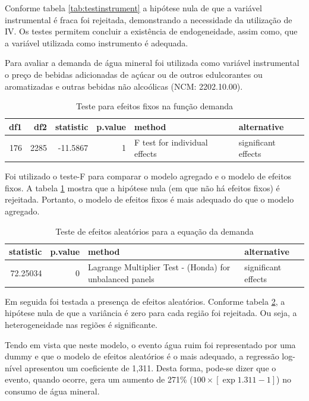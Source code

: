 \documentclass[
  12pt,
]{book}
\begin{document}
Conforme tabela \ref{tab:testinstrument} a hipótese nula de que a variável instrumental é fraca foi rejeitada, demonstrando a necessidade da utilização de IV. Os testes permitem concluir a existência de endogeneidade, assim como, que a variável utilizada como instrumento é adequada.

Para avaliar a demanda de água mineral foi utilizada como variável instrumental o preço de bebidas adicionadas de açúcar ou de outros edulcorantes ou aromatizadas e outras bebidas não alcoólicas (NCM: 2202.10.00).

\begin{table}

\caption{\label{tab:testf}Teste para efeitos fixos na função demanda}
\centering
\begin{tabular}[t]{r|r|r|r|l|l}
\hline
df1 & df2 & statistic & p.value & method & alternative\\
\hline
176 & 2285 & -11.5867 & 1 & F test for individual effects & significant effects\\
\hline
\end{tabular}
\end{table}

Foi utilizado o teste-F para comparar o modelo agregado e o modelo de efeitos fixos. A tabela \ref{tab:testf} mostra que a hipótese nula (em que não há efeitos fixos) é rejeitada. Portanto, o modelo de efeitos fixos é mais adequado do que o modelo agregado.

\begin{table}

\caption{\label{tab:randomt2}Teste de efeitos aleatórios para a equação da demanda}
\centering
\begin{tabular}[t]{r|r|l|l}
\hline
statistic & p.value & method & alternative\\
\hline
72.25034 & 0 & Lagrange Multiplier Test -  (Honda) for unbalanced panels & significant effects\\
\hline
\end{tabular}
\end{table}

Em seguida foi testada a presença de efeitos aleatórios. Conforme tabela \ref{tab:randomt2}, a hipótese nula de que a variância é zero para cada região foi rejeitada. Ou seja, a heterogeneidade nas regiões é significante.

Tendo em vista que neste modelo, o evento água ruim foi representado por uma dummy e que o modelo de efeitos aleatórios é o mais adequado, a regressão log-nível apresentou um coeficiente de 1,311. Desta forma, pode-se dizer que o evento, quando ocorre, gera um aumento de 271\% (\(100 \times [\exp{1.311}-1]\)) no consumo de água mineral.
\end{document}
